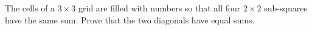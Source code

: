 The cells of a $3\times3$ grid are filled with numbers so that all four $2\times2$ sub-squares have the same sum. Prove that the two diagonals have equal sums.
